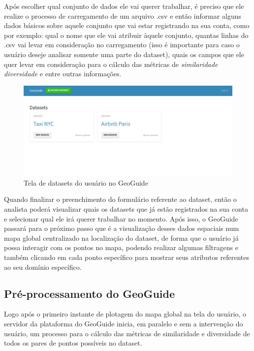 Após escolher qual conjunto de dados ele vai querer trabalhar, é preciso que ele realize o processo de carregamento de um arquivo .csv e então informar alguns dados básicos sobre aquele conjunto que vai estar registrando na sua conta, como por exemplo: qual o nome que ele vai atribuir àquele conjunto, quantas linhas do .csv vai levar em consideração no carregamento (isso é importante para caso o usuário deseje analisar somente uma parte do dataset), quais os campos que ele quer levar em consideração para o cálculo das métricas de \textit{similaridade} \textit{diversidade} e entre outras informações.

\begin{figure}[h]
	\centering
	\includegraphics[width=\textwidth]{images/geoguide-datasets.png}
	\caption{Tela de datasets do usuário no GeoGuide}
	\label{fig:geoguide-datasets}
	\vspace{-10pt}
\end{figure}

Quando finalizar o preenchimento do formulário referente ao dataset, então o analista poderá visualizar quais os datasets que já estão registrados na sua conta e selecionar qual ele irá querer trabalhar no momento. Após isso, o GeoGuide passará para o próximo passo que é a visualização desses dados espaciais num mapa global centralizado na localização do dataset, de forma que o usuário já possa interagir com os pontos no mapa, podendo realizar algumas filtragens e também clicando em cada ponto específico para mostrar seus atributos referentes ao seu domínio específico.

\subsection{Pré-processamento do GeoGuide}

Logo após o primeiro instante de plotagem do mapa global na tela do usuário, o servidor da plataforma do GeoGuide inicia, em paralelo e sem a intervenção do usuário, um processo para o cálculo das métricas de similaridade e diversidade de todos os pares de pontos possíveis no dataset.

